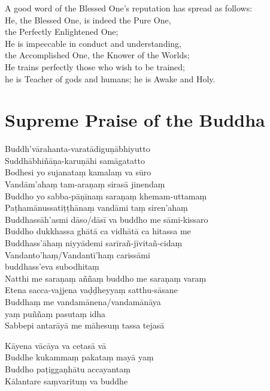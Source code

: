A good word of the Blessed One's reputation has spread as follows:\\
He, the Blessed One, is indeed the Pure One,\\
\vin the Perfectly Enlightened One;\\
He is impeccable in conduct and understanding,\\
\vin the Accomplished One, the Knower of the Worlds;\\
He trains perfectly those who wish to be trained;\\
\vin he is Teacher of gods and humans; he is Awake and Holy.

\section*{Supreme Praise of the Buddha}

\begin{leader}
\end{leader}

Buddh'vārahanta-varatādiguṇābhiyutto\\
Suddhābhiñāṇa-karuṇāhi samāgatatto\\
Bodhesi yo sujanataṃ kamalaṃ va sūro\\
Vandām'ahaṃ tam-araṇaṃ sirasā jinendaṃ\\
Buddho yo sabba-pāṇīnaṃ saraṇaṃ khemam-uttamaṃ\\
Paṭhamānussatiṭṭhānaṃ vandāmi taṃ siren'ahaṃ\\
Buddhassāh'asmi dāso/dāsī va buddho me sāmi-kissaro\\
Buddho dukkhassa ghātā ca vidhātā ca hitassa me\\
Buddhass'āhaṃ niyyādemi sarīrañ-jīvitañ-cidaṃ\\
Vandanto'haṃ/Vandantī'haṃ carissāmi\\
\vin buddhass'eva subodhitaṃ\\
Natthi me saraṇaṃ aññaṃ buddho me saraṇaṃ varaṃ\\
Etena sacca-vajjena vaḍḍheyyaṃ satthu-sāsane\\
Buddhaṃ me vandamānena/vandamānāya\\
\vin yaṃ puññaṃ pasutaṃ idha\\
Sabbepi antarāyā me māhesuṃ tassa tejasā


Kāyena vācāya va cetasā vā\\
Buddhe kukammaṃ pakataṃ mayā yaṃ\\
Buddho paṭiggaṇhātu accayantaṃ\\
Kālantare saṃvarituṃ va buddhe

